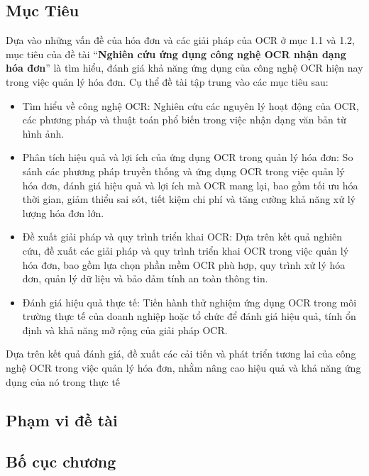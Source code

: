 \subsection{Mục Tiêu}
Dựa vào những vấn đề của hóa đơn và các giải pháp của OCR ở mục 1.1 và 1.2, mục tiêu của đề tài “\textbf{Nghiên cứu ứng dụng công nghệ OCR nhận dạng hóa đơn}” là tìm hiểu, đánh giá khả năng ứng dụng của công nghệ OCR hiện nay trong việc quản lý hóa đơn. Cụ thể đề tài tập trung vào các mục tiêu sau:
\begin{itemize}
    \item Tìm hiểu về công nghệ OCR: Nghiên cứu các nguyên lý hoạt động của OCR, các phương pháp và thuật toán phổ biến trong việc nhận dạng văn bản từ hình ảnh.
    \item Phân tích hiệu quả và lợi ích của ứng dụng OCR trong quản lý hóa đơn: So sánh các phương pháp truyền thống và ứng dụng OCR trong việc quản lý hóa đơn, đánh giá hiệu quả và lợi ích mà OCR mang lại, bao gồm tối ưu hóa thời gian, giảm thiểu sai sót, tiết kiệm chi phí và tăng cường khả năng xử lý lượng hóa đơn lớn.
    \item Đề xuất giải pháp và quy trình triển khai OCR: Dựa trên kết quả nghiên cứu, đề xuất các giải pháp và quy trình triển khai OCR trong việc quản lý hóa đơn, bao gồm lựa chọn phần mềm OCR phù hợp, quy trình xử lý hóa đơn, quản lý dữ liệu và bảo đảm tính an toàn thông tin.
    \item Đánh giá hiệu quả thực tế: Tiến hành thử nghiệm ứng dụng OCR trong môi trường thực tế của doanh nghiệp hoặc tổ chức để đánh giá hiệu quả, tính ổn định và khả năng mở rộng của giải pháp OCR.
\end{itemize}
Dựa trên kết quả đánh giá, đề xuất các cải tiến và phát triển tương lai của công nghệ OCR trong việc quản lý hóa đơn, nhằm nâng cao hiệu quả và khả năng ứng dụng của nó trong thực tế

\subsection{Phạm vi đề tài}
\subsection{Bố cục chương}